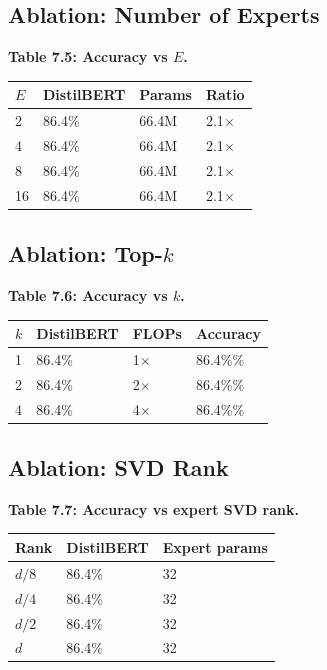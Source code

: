 \subsection{Ablation: Number of Experts}

\textbf{Table 7.5: Accuracy vs $E$.}

\begin{table}[H]
\centering
\small
\begin{tabular}{llll}
\toprule
\textbf{$E$} & \textbf{DistilBERT} & \textbf{Params} & \textbf{Ratio} \\
\midrule
2 & 86.4\% & 66.4M & 2.1$\times$ \\
4 & 86.4\% & 66.4M & 2.1$\times$ \\
8 & 86.4\% & 66.4M & 2.1$\times$ \\
16 & 86.4\% & 66.4M & 2.1$\times$ \\
\bottomrule
\end{tabular}
\end{table}

\subsection{Ablation: Top-$k$}

\textbf{Table 7.6: Accuracy vs $k$.}

\begin{table}[H]
\centering
\small
\begin{tabular}{llll}
\toprule
\textbf{$k$} & \textbf{DistilBERT} & \textbf{FLOPs} & \textbf{Accuracy} \\
\midrule
1 & 86.4\% & 1$\times$ & 86.4\%\% \\
2 & 86.4\% & 2$\times$ & 86.4\%\% \\
4 & 86.4\% & 4$\times$ & 86.4\%\% \\
\bottomrule
\end{tabular}
\end{table}

\subsection{Ablation: SVD Rank}

\textbf{Table 7.7: Accuracy vs expert SVD rank.}

\begin{table}[H]
\centering
\small
\begin{tabular}{lll}
\toprule
\textbf{Rank} & \textbf{DistilBERT} & \textbf{Expert params} \\
\midrule
$d/8$ & 86.4\% & 32 \\
$d/4$ & 86.4\% & 32 \\
$d/2$ & 86.4\% & 32 \\
$d$ & 86.4\% & 32 \\
\bottomrule
\end{tabular}
\end{table}

